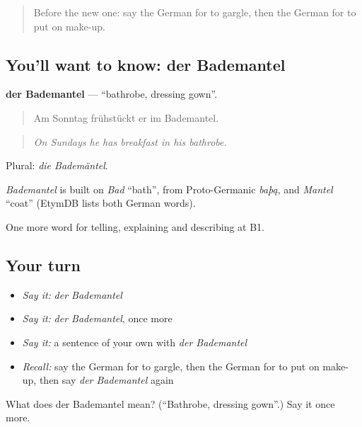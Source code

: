 \begin{quote}
Before the new one: say the German for to gargle, then the German for to put on make-up.
\end{quote}

\subsection*{You'll want to know: der Bademantel}
\textbf{der Bademantel} — \textquotedblleft{}bathrobe, dressing gown\textquotedblright{}.

\begin{quote}
Am Sonntag frühstückt er im Bademantel.
\end{quote}

\begin{quote}
\emph{On Sundays he has breakfast in his bathrobe.}
\end{quote}

Plural: \emph{die Bademäntel}.

\begin{cousinweb}
\emph{Bademantel} is built on \emph{Bad} \textquotedblleft{}bath\textquotedblright{}, from Proto-Germanic \emph{baþą}, and \emph{Mantel} \textquotedblleft{}coat\textquotedblright{} (EtymDB lists both German words).
\end{cousinweb}

\begin{grammarlens}[title={What you've built}]
One more word for telling, explaining and describing at B1.
\end{grammarlens}

\subsection*{Your turn}
\begin{itemize}
\raggedright
  \item \emph{Say it:} \emph{der Bademantel}
  \item \emph{Say it:} \emph{der Bademantel}, once more
  \item \emph{Say it:} a sentence of your own with \emph{der Bademantel}
  \item \emph{Recall:} say the German for to gargle, then the German for to put on make-up, then say \emph{der Bademantel} again
\end{itemize}

\begin{tcolorbox}[breakable,colback=teal!4,colframe=teal!35!black,title={Before you move on}]
What does der Bademantel mean? (\textquotedblleft{}Bathrobe, dressing gown\textquotedblright{}.) Say it once more.
\end{tcolorbox}
